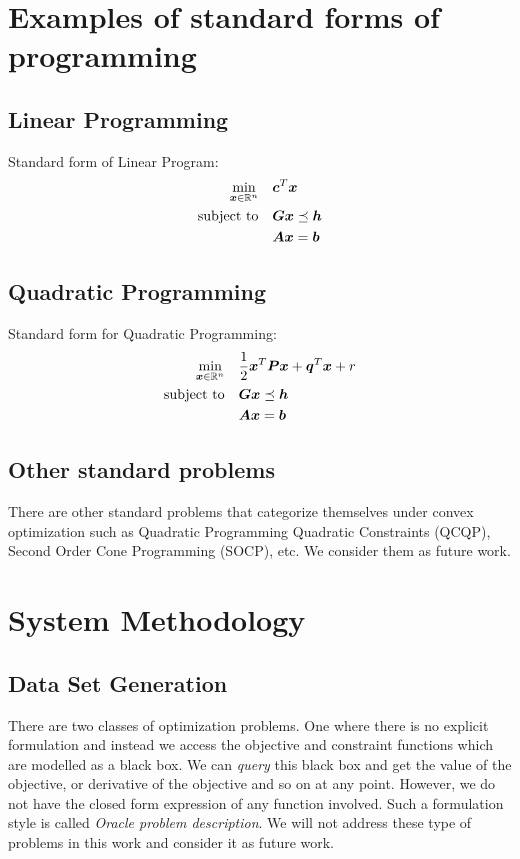 \documentclass{article} %
\begin{document}
\section{Examples of standard forms of programming}
\subsection{Linear Programming}
Standard form of Linear Program:
\begin{subequations}
   \begin{align}
      \min_{{\bm{x}} \in \mathbb{R}^n} \quad & {\bm{c}}^T {\bm{x}} \\
      \text{subject to} \quad & {\bm{G}}{\bm{x}} \preceq {\bm{h}} \\
      & {\bm{A}}{\bm{x}} = {\bm{b}}
      \end{align}
\end{subequations}

\subsection{Quadratic Programming}
Standard form for Quadratic Programming:
\begin{subequations}
   \begin{align}
      \min_{{\bm{x}} \in \mathbb{R}^n} \quad &\frac{1}{2}{{\bm{x}}}^T {\bm{P}} {\bm{x}} + {\bm{q}}^T {\bm{x}} + r \\ 
      \text{subject to} \quad & {\bm{G}}{\bm{x}} \preceq {\bm{h}}  \\
      & {\bm{A}}{\bm{x}} = {\bm{b}}
   \end{align}
\end{subequations}

\subsection{Other standard problems}
There are other standard problems that categorize themselves under convex optimization such as Quadratic Programming Quadratic Constraints (QCQP), Second Order Cone Programming (SOCP), etc. We consider them as future work.

\section{System Methodology}

\subsection{Data Set Generation}
There are two classes of optimization problems. One where there is no explicit formulation and instead we access the objective and constraint functions which are modelled as a black box. We can \emph{query} this black box and get the value of the objective, or derivative of the objective and so on at any point. However, we do not have the closed form expression of any function involved. Such a formulation style is called \emph{Oracle problem description}. We will not address these type of problems in this work and consider it as future work.
\end{document}
